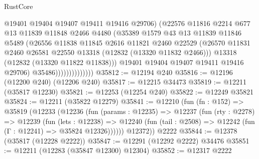 \begin{lexlean}{RustCore}
\begin{coremodule}
                                @19401
                                @19404
                                @19407
                                @19411
                                @19416
                                @29706)
                              (@22576
                                @11816
                                @2214
                                @677
                                @13
                                @11839
                                @11848
                                @2466
                                @4480
                                (@35389
                                  @1579
                                  @43
                                  @13
                                  @11839
                                  @11846
                                  @5489
                                  (@26556
                                    @11838
                                    @11845
                                    @2616
                                    @11821
                                    @2460
                                    @22529
                                    (@26570
                                      @11831
                                      @2460
                                      @26581
                                      @22550
                                      @13318
                                      (@12832 (@13320 @11832 @2466)))
                                    @13318
                                    (@12832 (@13320 @11822 @11838)))
                                  @19401
                                  @19404
                                  @19407
                                  @19411
                                  @19416
                                  @29706)
                                @35486))))))))))))))
@35812 := @12194 @240
@35816 := @12196 (@12200 @240) (@12206 @240)
@35817 := @12215 @34473
@35819 := @12211 (@35817 @12230)
@35821 := @12253 (@12254 @240)
@35822 := @12249 @35821
@35824 := @12211 (@35822 @12279)
@35841 := @12210
    (fun (fn : @152) =>
    @35819
      (@12233
        (@12236
          (fun (params : @12235) =>
          @12237
            (fun (rty : @2278) =>
            @12239
              (fun (lets : @12238) =>
              @12240 (fun (tail : @2508) => @12242 (fun (Γ : @12241) => @35824 @12326))))))
        @12372))
    @2222
@35844 := @12378 (@35817 (@12228 @2222))
@35847 := @12291 (@12292 @2222) @34476
@35851 := @12211 (@12283 (@35847 @12300) @12304)
@35852 := @12317 @2222

\end{coremodule}
\end{lexlean}
